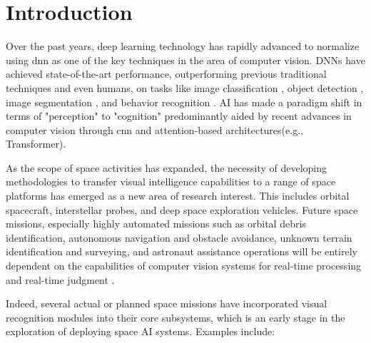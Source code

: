 \chapter{Introduction}

Over the past years, deep learning technology has rapidly advanced to normalize using \gls{dnn} as one of the key techniques in the area of computer vision. DNNs have achieved state-of-the-art performance, outperforming previous traditional techniques and even humans, on tasks like image classification \cite{deng2009imagenet}, object detection \cite{redmon2016you}, image segmentation \cite{ronneberger2015u}, and behavior recognition \cite{carreira2017quo}. AI has made a paradigm shift in terms of "perception" to "cognition" predominantly aided by recent advances in computer vision through \gls{cnn} and attention-based architectures(e.g., Transformer).

As the scope of space activities has expanded, the necessity of developing methodologies to transfer visual intelligence capabilities to a range of space platforms has emerged as a new area of research interest. This includes orbital spacecraft, interstellar probes, and deep space exploration vehicles. Future space missions, especially highly automated missions such as orbital debris identification, autonomous navigation and obstacle avoidance, unknown terrain identification and surveying, and astronaut assistance operations will be entirely dependent on the capabilities of computer vision systems for real-time processing and real-time judgment \cite{Zhang2022}. 



Indeed, several actual or planned space missions have incorporated visual recognition modules into their core subsystems, which is an early stage in the exploration of deploying space AI systems. Examples include:


